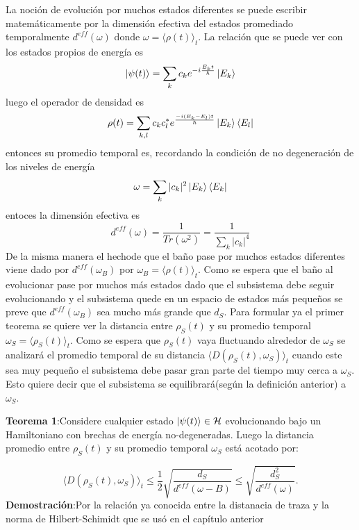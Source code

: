 La noción de evolución por muchos estados diferentes se puede escribir matemáticamente por la dimensión efectiva del estados promediado temporalmente $d^{eff}(\omega)$ donde $\omega=\langle \rho(t) \rangle_{t}$. La relación que se puede ver con los estados propios de energía es 
\begin{equation}
\ket{\psi(t)} = \sum_{k} c_{k} e^{-i\frac{E_{k}t}{\hbar}} \ket{E_{k}}
\end{equation}
luego el operador de densidad es 
\begin{equation}
\rho(t)=\sum_{k,l} c_{k} c_{l}^{*} e^{\frac{-i(E_{k}-E_{l})t}{\hbar}}\ket{E_{k}} \bra{E_{l}}
\end{equation}
entonces su promedio temporal es, recordando la condición de no degeneración de los niveles de energía
\begin{equation}
\omega= \sum_{k} |c_{k}|^{2} \ket{E_{k}} \bra{E_{k}}
\end{equation}
entoces la dimensión efectiva es 
\begin{equation}
d^{eff}(\omega)=\frac{1}{Tr(\omega^{2})}=\frac{1}{\sum_{k} |c_{k}|^{4} }
\end{equation}
De la misma manera el hechode que el baño pase por muchos estados diferentes viene dado por $d^{eff}(\omega_{B})$ por $\omega_{B}=\langle \rho(t) \rangle_{t}$. Como se espera que el baño al evolucionar pase por muchos más estados dado que el subsistema debe seguir evolucionando y el subsistema quede en un espacio de estados más pequeños se preve que $d^{eff}(\omega_{B})$ sea mucho más grande que $d_{S}$. Para formular ya el primer teorema se quiere ver la distancia entre $\rho_{S}(t)$ y su promedio temporal $\omega_{S}= \langle \rho_{S}(t) \rangle_{t}$. Como se espera que $\rho_{S}(t) $ vaya fluctuando alrededor de $\omega_{S}$ se analizará el promedio temporal de su distancia $\langle D(\rho_{S}(t) ,\omega_{S}) \rangle_{t}$ cuando este sea muy pequeño el subsistema debe pasar gran parte del tiempo muy cerca a $\omega_{S}$. Esto quiere decir que el subsistema se equilibrará(según la definición anterior) a $\omega_{S}$.

\textbf{Teorema 1}:Considere cualquier estado $\ket{\psi(t)} \in \mathcal{H}$ evolucionando bajo un Hamiltoniano con brechas de energía no-degeneradas. Luego la distancia promedio entre $\rho_{S}(t)$ y su promedio temporal $\omega_{S}$ está acotado por:

\begin{equation}
\langle D(\rho_{S}(t) ,\omega_{S}) \rangle_{t} \le \frac{1}{2} \sqrt{\frac{d_{S}}{d^{eff}(\omega-{B})}} \le \sqrt{\frac{d_{S}^{2}}{d^{eff}(\omega)}}.
\end{equation}
\textbf{Demostración}:Por la relación ya conocida entre la distanacia de traza y la norma de Hilbert-Schimidt que se usó en el capítulo anterior

